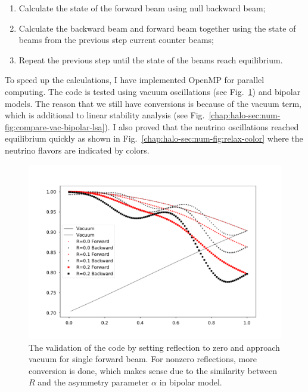 \begin{enumerate}
    \item
Calculate the state of the forward beam using null backward beam;
\item
Calculate the backward beam and forward beam together using the state of beams from the previous step current counter beams;
\item
Repeat the previous step until the state of the beams reach equilibrium.
\end{enumerate}
To speed up the calculations, I have implemented OpenMP for parallel computing. The code is tested using vacuum oscillations (see Fig.~\ref{chap:halo-sec:num-fig:compare-vac-bipolar-validate}) and bipolar models. The reason that we still have conversions is because of the vacuum term, which is additional to linear stability analysis (see Fig.~\ref{chap:halo-sec:num-fig:compare-vac-bipolar-lsa}). I also proved that the neutrino oscillations reached equilibrium quickly as shown in Fig.~\ref{chap:halo-sec:num-fig:relax-color} where the neutrino flavors are indicated by colors.


\begin{figure}[htbp]
    \centering
    \includegraphics[width=\textwidth]{chapters/assets/halo/halo-mu-4-r-multiple.pdf}
    \caption{The validation of the code by setting reflection to zero and approach vacuum for single forward beam. For nonzero reflections, more conversion is done, which makes sense due to the similarity between $R$ and the asymmetry parameter $\alpha$ in bipolar model.}
    \label{chap:halo-sec:num-fig:compare-vac-bipolar-validate}
\end{figure}


